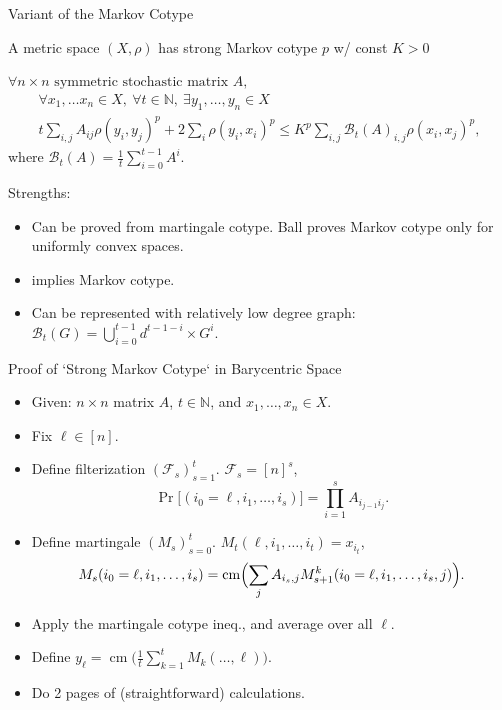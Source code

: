 \documentclass[compress]{beamer}
\DeclareMathOperator{\cm}{cm}
\begin{document}
\begin{frame}{Variant of the Markov Cotype}
\onslide<+->
\begin{definition}
A metric space $(X,\rho)$ has strong Markov cotype $p$ w/ const $K>0$ 

 $\forall n\times n \text{ symmetric stochastic matrix }A,$
 \vskip -0.2in
\begin{multline*}
  \forall x_1,\ldots x_n\in X, \ \forall t\in \mathbb N,\ \exists y_1,\ldots, y_n\in X \\
 t \sum_{i,j} A_{ij}\rho(y_i,y_j)^p+ 2\sum_i\rho(y_i,x_i)^p \le K^p\sum_{i,j}
 \mathcal B_t(A)_{i,j} \rho(x_i,x_j)^p, 
 \end{multline*}
 \vskip -0.2in
 where  $\mathcal B_t(A)= \frac 1t \sum_{i=0}^{t-1} A^i $.
\end{definition}

Strengths:
\begin{itemize}[<+->]
\item Can be proved from martingale cotype.  Ball proves Markov cotype only for uniformly convex spaces.
\item implies Markov cotype.
\item Can be represented with relatively low degree graph:\\
\( \mathcal B_t(G)= \bigcup_{i=0}^{t-1} d^{t-1-i} \times G^i . \)
\end{itemize}
\end{frame}

\begin{frame}{Proof of `Strong Markov Cotype` in Barycentric Space}
\begin{itemize}[<+->]
\item Given: $n\times n$ matrix $A$, $t\in \mathbb N$, and $x_1,\ldots, x_n\in X$.
\item Fix $\ell\in [n]$.
\item Define  filterization $(\mathcal F_s)_{s=1}^t$.  $\mathcal F_s=[n]^s$,
\[ \Pr\bigl[(i_0=\ell,i_1,\ldots, i_s)\bigr ]=\prod_{i=1}^s A_{i_{j-1} i_j}. \]
\item Define martingale $(M_s)_{s=0}^t$. $M_t(\ell,i_1,\ldots, i_t)=x_{i_t}$,
\[ M_s(i_0=\ell,i_1,\ldots, i_s)= \cm \Bigl( \sum_j A_{i_s,j}M^k_{s+1}(i_0=\ell,i_1,\ldots, i_s,j) \Bigr ) .\]
\item Apply the martingale cotype ineq., and average over all $\ell$.
\item Define $y_\ell=\cm\bigl (\tfrac{1}{t} \sum_{k=1}^t M_k(\ldots, \ell) \bigr)$. 
\item Do 2 pages of (straightforward) calculations.
\end{itemize}
\end{frame}
\end{document}
